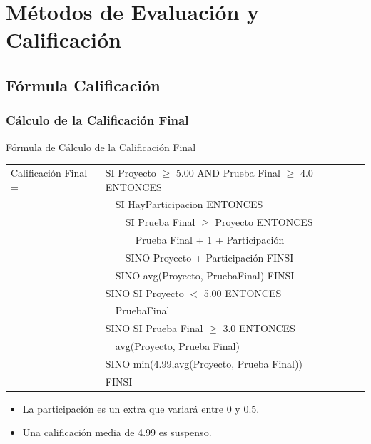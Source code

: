 \documentclass[a4paper,slidestop,xcolor=pst,dvips,blue]{beamer}
\begin{document}
\section{Métodos de Evaluación y Calificación}

\subsection{Fórmula Calificación}

\begin{frame}[c]
	\frametitle{Cálculo de la Calificación Final}
	\begin{block}{Fórmula de Cálculo de la Calificación Final}
		\begin{scriptsize}
        \begin{tabular}{ll}
			Calificación Final = & SI Proyecto $\geq$ 5.00 AND Prueba Final $\geq$ 4.0 ENTONCES \\
								 & \ \ SI HayParticipacion ENTONCES \\
                                 & \ \ \ \ SI Prueba Final $\geq$ Proyecto ENTONCES \\
                                 & \ \ \ \ \ \ Prueba Final + 1 + Participación \\
                                 & \ \ \ \ SINO Proyecto + Participación FINSI \\
                                 & \ \ SINO avg(Proyecto, PruebaFinal) FINSI \\
                                 & SINO SI Proyecto $<$ 5.00 ENTONCES \\
                                 & \ \  PruebaFinal \\
                                 & SINO SI Prueba Final $\geq$ 3.0 ENTONCES \\
                                 & \ \ avg(Proyecto, Prueba Final) \\
                                 & SINO min(4.99,avg(Proyecto, Prueba Final)) \\
                                 & FINSI \\
		\end{tabular}
        \end{scriptsize}
	\end{block}
	\begin{itemize}
        \item<2-> La participación es un extra que variará entre 0 y 0.5.
        \item<3-> Una calificación media de 4.99 es suspenso.
	\end{itemize}
\end{frame}
\end{document}
